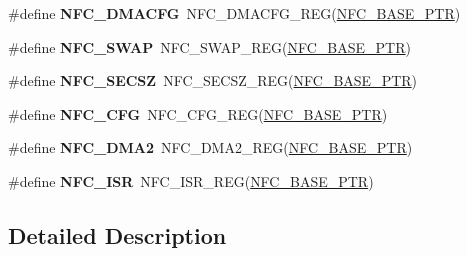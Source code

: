 \begin{DoxyCompactItemize}
\item 
\hypertarget{group___n_f_c___register___accessor___macros_ga866fb5bfd99d02c96c0d30f606348c0a}{}\#define {\bfseries N\+F\+C\+\_\+\+D\+M\+A\+C\+F\+G}~N\+F\+C\+\_\+\+D\+M\+A\+C\+F\+G\+\_\+\+R\+E\+G(\hyperlink{group___n_f_c___peripheral_ga0777810803d598d0a435f71acd967563}{N\+F\+C\+\_\+\+B\+A\+S\+E\+\_\+\+P\+T\+R})\label{group___n_f_c___register___accessor___macros_ga866fb5bfd99d02c96c0d30f606348c0a}

\item 
\hypertarget{group___n_f_c___register___accessor___macros_ga645a83e89c1dbf1081fcc47db002faf3}{}\#define {\bfseries N\+F\+C\+\_\+\+S\+W\+A\+P}~N\+F\+C\+\_\+\+S\+W\+A\+P\+\_\+\+R\+E\+G(\hyperlink{group___n_f_c___peripheral_ga0777810803d598d0a435f71acd967563}{N\+F\+C\+\_\+\+B\+A\+S\+E\+\_\+\+P\+T\+R})\label{group___n_f_c___register___accessor___macros_ga645a83e89c1dbf1081fcc47db002faf3}

\item 
\hypertarget{group___n_f_c___register___accessor___macros_gabe6f8da82283fd62ea786fd1b3b38308}{}\#define {\bfseries N\+F\+C\+\_\+\+S\+E\+C\+S\+Z}~N\+F\+C\+\_\+\+S\+E\+C\+S\+Z\+\_\+\+R\+E\+G(\hyperlink{group___n_f_c___peripheral_ga0777810803d598d0a435f71acd967563}{N\+F\+C\+\_\+\+B\+A\+S\+E\+\_\+\+P\+T\+R})\label{group___n_f_c___register___accessor___macros_gabe6f8da82283fd62ea786fd1b3b38308}

\item 
\hypertarget{group___n_f_c___register___accessor___macros_gab5211bf8a9d2f64356ca545640aba77a}{}\#define {\bfseries N\+F\+C\+\_\+\+C\+F\+G}~N\+F\+C\+\_\+\+C\+F\+G\+\_\+\+R\+E\+G(\hyperlink{group___n_f_c___peripheral_ga0777810803d598d0a435f71acd967563}{N\+F\+C\+\_\+\+B\+A\+S\+E\+\_\+\+P\+T\+R})\label{group___n_f_c___register___accessor___macros_gab5211bf8a9d2f64356ca545640aba77a}

\item 
\hypertarget{group___n_f_c___register___accessor___macros_gac5d971130bd0cb86dac8e9b19705cf95}{}\#define {\bfseries N\+F\+C\+\_\+\+D\+M\+A2}~N\+F\+C\+\_\+\+D\+M\+A2\+\_\+\+R\+E\+G(\hyperlink{group___n_f_c___peripheral_ga0777810803d598d0a435f71acd967563}{N\+F\+C\+\_\+\+B\+A\+S\+E\+\_\+\+P\+T\+R})\label{group___n_f_c___register___accessor___macros_gac5d971130bd0cb86dac8e9b19705cf95}

\item 
\hypertarget{group___n_f_c___register___accessor___macros_gae10f5f8dee54a1e7f14f0b2cc8d98337}{}\#define {\bfseries N\+F\+C\+\_\+\+I\+S\+R}~N\+F\+C\+\_\+\+I\+S\+R\+\_\+\+R\+E\+G(\hyperlink{group___n_f_c___peripheral_ga0777810803d598d0a435f71acd967563}{N\+F\+C\+\_\+\+B\+A\+S\+E\+\_\+\+P\+T\+R})\label{group___n_f_c___register___accessor___macros_gae10f5f8dee54a1e7f14f0b2cc8d98337}

\end{DoxyCompactItemize}


\subsection{Detailed Description}
